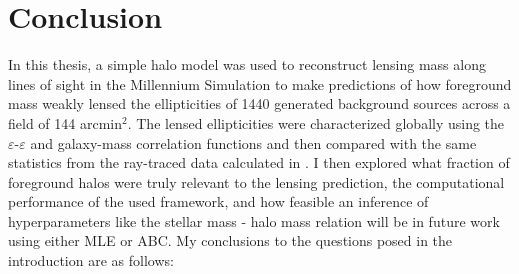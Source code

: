 \documentclass[%
 reprint,
 amsmath,amssymb,
 aps,nofootinbib
]{revtex4-1}
\begin{document}
\section{Conclusion} \label{conclusion}

In this thesis, a simple halo model was used to reconstruct lensing mass along lines of sight in the Millennium Simulation to make predictions of how foreground mass weakly lensed the ellipticities of 1440 generated background sources across a field of 144 arcmin$^2$. The lensed ellipticities were characterized globally using the $\varepsilon$-$\varepsilon$ and galaxy-mass correlation functions and then compared with the same statistics from the ray-traced data calculated in \cite{ray_tracing}. I then explored what fraction of foreground halos were truly relevant to the lensing prediction, the computational performance of the used framework, and how feasible an inference of hyperparameters like the stellar mass - halo mass relation will be in future work using either MLE or ABC. My conclusions to the questions posed in the introduction are as follows:
\end{document}
